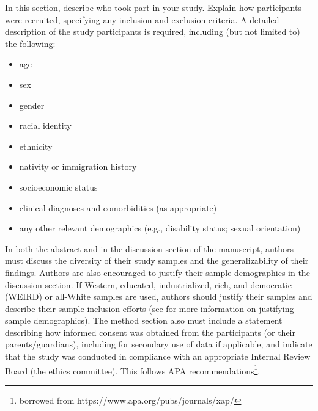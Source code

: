 In this section, describe who took part in your study. Explain how participants were recruited, specifying any inclusion and exclusion criteria.
A detailed description of the study participants is required, including (but not limited to) the following:
\begin{itemize}
    \item age
    \item sex
    \item gender
    \item racial identity
    \item ethnicity
    \item nativity or immigration history
    \item socioeconomic status
    \item clinical diagnoses and comorbidities (as appropriate)
    \item any other relevant demographics (e.g., disability status; sexual orientation)
\end{itemize}

In both the abstract and in the discussion section of the manuscript, authors must discuss the diversity of their study samples and the generalizability of their findings.
Authors are also encouraged to justify their sample demographics in the discussion section. If Western, educated, industrialized, rich, and democratic (WEIRD) or all-White samples are used, authors should justify their samples and describe their sample inclusion efforts (see \citet{roberts2020racial} for more information on justifying sample demographics).
The method section also must include a statement describing how informed consent was obtained from the participants (or their parents/guardians), including for secondary use of data if applicable, and indicate that the study was conducted in compliance with an appropriate Internal Review Board (the ethics committee). This follows APA recommendations\footnote{borrowed from https://www.apa.org/pubs/journals/xap/}.